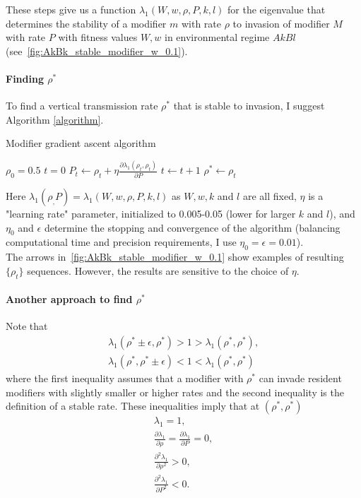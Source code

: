\documentclass[11pt, oneside]{article}   	%
\begin{document}
These steps give us a function $\lambda_1(W, w, \rho, P, k, l)$ for the eigenvalue that determines the stability of a modifier $m$ with rate $\rho$ to invasion of modifier $M$ with rate $P$ with fitness values $W, w$ in environmental regime $AkBl$ (see~\autoref{fig:AkBk_stable_modifier_w_0.1}).
\\

\paragraph{Finding $\rho^*$}
To find a vertical transmission rate $\rho^*$ that is stable to invasion,
I suggest Algorithm \autoref{algorithm}.

\begin{algorithm} 
\caption{Modifier gradient ascent algorithm}\label{algorithm}
\begin{algorithmic}[1]
\State $\rho_{0} = 0.5$
\State $t = 0$
	\State $P_{t} \gets \rho_{t} + \eta \frac{\partial \lambda_1(\rho_{t}, \rho_{t})}{\partial P}$
	\Else
	\EndIf
	\State $t \gets t+1$
\EndWhile
\State $\rho^* \gets \rho_t$
\end{algorithmic}
\end{algorithm}

Here $\lambda_1(\rho_, P)=\lambda_1(W, w, \rho, P, k, l)$ as $W, w, k$ and $l$ are all fixed, $\eta$ is a "learning rate" parameter, initialized to 0.005-0.05 (lower for larger $k$ and $l$), and $\eta_0$ and $\epsilon$ determine the stopping and convergence of the algorithm (balancing computational time and precision requirements, I use $\eta_0= \epsilon = 0.01$).
\\
The arrows in~\autoref{fig:AkBk_stable_modifier_w_0.1} show examples of resulting $\{\rho_{t}\}$ sequences.
However, the results are sensitive to the choice of $\eta$.

\paragraph{Another approach to find $\rho^*$}
Note that
\begin{align}
\lambda_1(\rho^* \pm \epsilon, \rho^*) > 1 > \lambda_1(\rho^*, \rho^*), \\
\lambda_1(\rho^*, \rho^* \pm \epsilon) < 1 < \lambda_1(\rho^*, \rho^*)
\end{align}
where the first inequality assumes that a modifier with $\rho^*$ can invade resident modifiers with slightly smaller or higher rates and the second inequality is the definition of a stable rate.
These inequalities imply that at $(\rho^*,\rho^*)$
\begin{align}
\lambda_1 = 1, \\
\frac{\partial \lambda_1}{\partial \rho} = \frac{\partial \lambda_1}{\partial P} = 0, \\
\frac{\partial^2 \lambda_1}{\partial \rho^2} > 0, \\
\frac{\partial^2 \lambda_1}{\partial P^2} < 0. 
\end{align}
\end{document}
